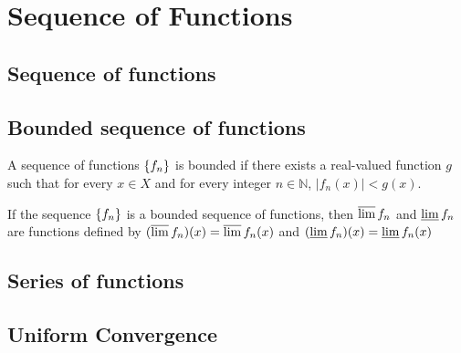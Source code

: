 \chapter{Sequence of Functions}
\section{Sequence of functions}

\section{Bounded sequence of functions}
	\begin{definition}
		A sequence of functions $\{f_n\}$ is bounded if there exists a real-valued function $g$ such that for every $x \in X$ and for every integer $n \in \mathbb{N}$, $|f_n(x)| < g(x)$.
	\end{definition}
	\begin{definition}
		If the sequence $\{f_n\}$ is a bounded sequence of functions, then $\varlimsup f_n$ and $\varliminf f_n$ are functions defined by $(\varlimsup f_n)(x) = \varlimsup f_n(x)$ and $(\varliminf f_n)(x) = \varliminf f_n(x)$
	\end{definition}

\section{Series of functions}

\section{Uniform Convergence}
